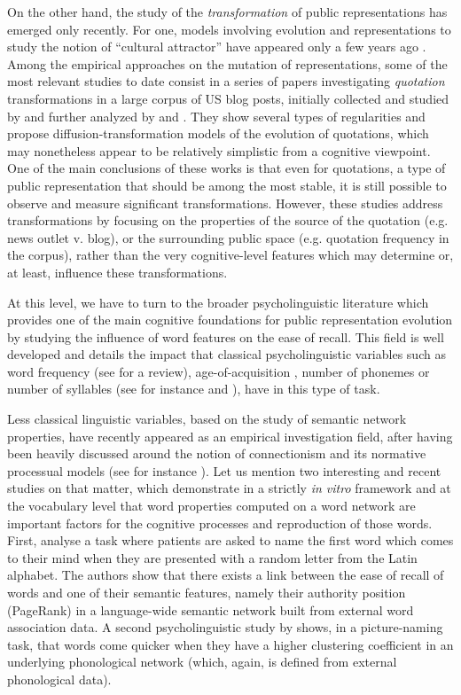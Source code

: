 On the other hand, the study of the \emph{transformation} of public representations has emerged only recently.
For one, models involving evolution and representations to study the notion of ``cultural attractor'' have appeared only a few years ago \citep{Claidiere07}.
Among the empirical approaches on the mutation of representations, some of the most relevant studies to date consist in a series of papers investigating \emph{quotation} transformations in a large corpus of US blog posts, initially collected and studied by \citet{Leskovec09} and further analyzed by \citet{Simmons11} and \citet{omod-mult}.
They show several types of regularities and propose diffusion-transformation models of the evolution of quotations, which may nonetheless appear to be relatively simplistic from a cognitive viewpoint.
One of the main conclusions of these works is that even for quotations, a type of public representation that should be among the most stable, it is still possible to observe and measure significant transformations.
However, these studies address transformations by focusing on the properties of the source of the quotation (e.g. news outlet v. blog), or the surrounding public space (e.g. quotation frequency in the corpus), rather than the very cognitive-level features which may determine or, at least, influence these transformations.

At this level, we have to turn to the broader psycholinguistic literature which provides one of the main cognitive foundations for public representation evolution by studying the influence of word features on the ease of recall.
This field is well developed and details the impact that classical psycholinguistic variables such as word frequency (see \citet{Yonelinas02} for a review), age-of-acquisition \citep{Zevin02}, number of phonemes or number of syllables (see for instance \citet{Rey98} and \citet{nick-diss}), have in this type of task.

Less classical linguistic variables, based on the study of semantic network properties, have recently appeared as an empirical investigation field, after having been heavily discussed around the notion of connectionism and its normative processual models (see for instance \citet{collins1975spreading}).
Let us mention two interesting and recent studies on that matter, which demonstrate in a strictly \emph{in vitro} framework and at the vocabulary level that word properties computed on a word network are important factors for the cognitive processes and reproduction of those words.
First, \citet{Griffiths07} analyse a task where patients are asked to name the first word which comes to their mind when they are presented with a random letter from the Latin alphabet.
The authors show that there exists a link between the ease of recall of words and one of their semantic features, namely their authority position (PageRank) in a language-wide semantic network built from external word association data.
A second psycholinguistic study by \citet{Chan10} shows, in a picture-naming task, that words come quicker when they have a higher clustering coefficient in an underlying phonological network (which, again, is  defined from external phonological data).

